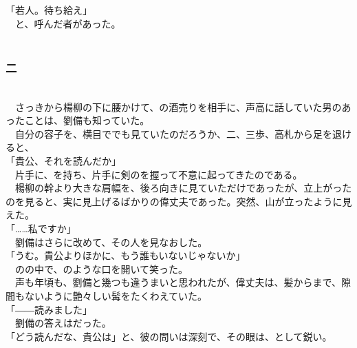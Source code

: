\documentclass[
  paper=a5,
  fontsize=10pt,
  jafontsize=9.5pt,
  tate,                  %
  open_bracket_pos=nibu, %
]{jlreq}
\begin{document}
「若人。待ち給え」\\


　と、呼んだ者があった。\\

\\

\subsubsection{二}

\\


　さっきから楊柳の下に腰かけて、の酒売りを相手に、声高に話していた男のあったことは、劉備も知っていた。\\


　自分の容子を、横目ででも見ていたのだろうか、二、三歩、高札から足を退けると、\\


「貴公、それを読んだか」\\


　片手に、を持ち、片手に剣のを握って不意に起ってきたのである。\\


　楊柳の幹より大きな肩幅を、後ろ向きに見ていただけであったが、立上がったのを見ると、実に見上げるばかりの偉丈夫であった。突然、山が立ったように見えた。\\


「……私ですか」\\


　劉備はさらに改めて、その人を見なおした。\\


「うむ。貴公よりほかに、もう誰もいないじゃないか」\\


　のの中で、のような口を開いて笑った。\\


　声も年頃も、劉備と幾つも違うまいと思われたが、偉丈夫は、髪からまで、隙間もないように艶々しい髯をたくわえていた。\\


「――読みました」\\


　劉備の答えはだった。\\


「どう読んだな、貴公は」と、彼の問いは深刻で、その眼は、として鋭い。\\
\end{document}

